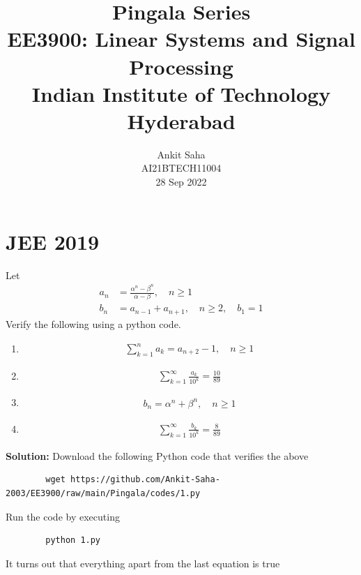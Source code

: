 \documentclass[journal,12pt,twocolumn]{IEEEtran}
\title{Pingala Series \\ \Large EE3900: Linear Systems and Signal Processing \\ \large Indian Institute of Technology Hyderabad}
\author{Ankit Saha \\ \normalsize AI21BTECH11004 \\ \vspace*{20pt} \normalsize 28 Sep 2022}
\newcommand{\solution}{\noindent \textbf{Solution: }}
\numberwithin{equation}{section}
\renewcommand\thesection{\arabic{section}}
\begin{document}
\maketitle

\section{JEE 2019}
Let 
\begin{align}
	a_n &= \frac{\alpha^{n}-\beta^{n}}{\alpha - \beta}, \quad n \ge 1
	\\
	b_n &= a_{n-1} + a_{n+1}, \quad n \ge 2, \quad b_1 =1
	\label{eq:10-orig-diff}
\end{align}
Verify the following using a python code.
\begin{enumerate}[label=\thesection.\arabic*,ref=\thesection.\theenumi]
\item 
\begin{align}
	\sum_{k=1}^{n}a_k = a_{n+2}-1, \quad n \ge 1
\end{align}
 \item 
\begin{align}
	\sum_{k=1}^{\infty}\frac{a_k}{10^k} =\frac{10}{89}
\end{align}
 \item 
\begin{align}
	b_n =\alpha^n + \beta^n, \quad n \ge 1
\end{align}
 \item 
\begin{align}
	\sum_{k=1}^{\infty}\frac{b_k}{10^k} =\frac{8}{89}
\end{align}
\end{enumerate}
\solution Download the following Python code that verifies the above
	\begin{lstlisting}
		wget https://github.com/Ankit-Saha-2003/EE3900/raw/main/Pingala/codes/1.py
	\end{lstlisting}
	
	Run the code by executing
	\begin{lstlisting}
		python 1.py
	\end{lstlisting}
	
	It turns out that everything apart from the last equation is true
\end{document}
